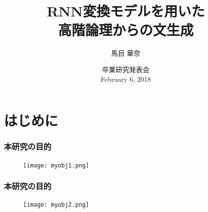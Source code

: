 \documentclass[dvipdfmx]{beamer}
\title{RNN変換モデルを用いた\\高階論理からの文生成}
\author[]{馬目 華奈}
\institute{戸次研究室}
\date{
卒業研究発表会\\
February 6, 2018}
\begin{document}
\begin{frame}
  \titlepage
\end{frame}



\section{はじめに}
\begin{frame}
\frametitle{本研究の目的}
\begin{center}
\begin{figure}[h]
	\texttt{[image: myobj1.png]}
        \label{fig:myobj1}
\end{figure}
\end{center}
\end{frame}

\begin{frame}
\frametitle{本研究の目的}
\begin{center}
\begin{figure}[h]
	\texttt{[image: myobj2.png]}
        \label{fig:myobj2}
\end{figure}
\end{center}
\end{frame}
\end{document}
